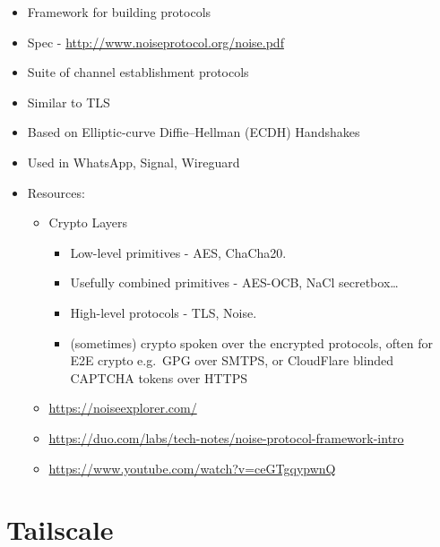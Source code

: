 \begin{itemize}
\tightlist
\item
  Framework for building protocols
\item
  Spec - \url{http://www.noiseprotocol.org/noise.pdf}
\item
  Suite of channel establishment protocols
\item
  Similar to TLS
\item
  Based on Elliptic-curve Diffie--Hellman (ECDH) Handshakes
\item
  Used in WhatsApp, Signal, Wireguard
\item
  Resources:

  \begin{itemize}
  \tightlist
  \item
    Crypto Layers

    \begin{itemize}
    \tightlist
    \item
      Low-level primitives - AES, ChaCha20.
    \item
      Usefully combined primitives - AES-OCB, NaCl secretbox\ldots{}
    \item
      High-level protocols - TLS, Noise.
    \item
      (sometimes) crypto spoken over the encrypted protocols, often for
      E2E crypto e.g.~GPG over SMTPS, or CloudFlare blinded CAPTCHA
      tokens over HTTPS
    \end{itemize}
  \item
    \url{https://noiseexplorer.com/}
  \item
    \url{https://duo.com/labs/tech-notes/noise-protocol-framework-intro}
  \item
    \url{https://www.youtube.com/watch?v=ceGTgqypwnQ}
  \end{itemize}
\end{itemize}

\hypertarget{tailscale}{%
\section{Tailscale}\label{tailscale}}


